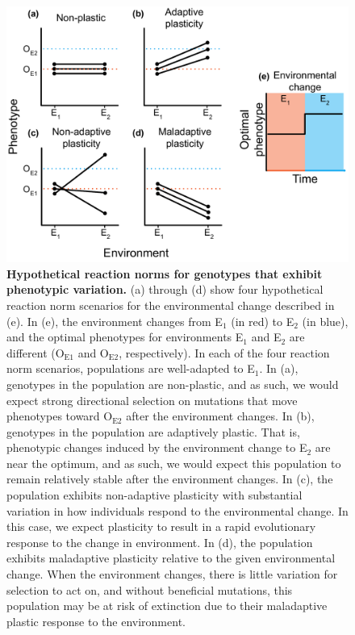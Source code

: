 \begin{figure}[ht!]
    \centering
    \includegraphics[width=\textwidth]{media/reaction-norms.pdf}
    \caption{\small
    \textbf{Hypothetical reaction norms for genotypes that exhibit phenotypic variation.}
    (a) through (d) show four hypothetical reaction norm scenarios for the environmental change described in (e).  
    In (e), the environment changes from E$_1$ (in red) to E$_2$ (in blue), and the optimal phenotypes for environments E$_1$ and E$_2$ are different (O$_{\text{E}1}$ and O$_{\text{E}2}$, respectively).
    In each of the four reaction norm scenarios, populations are well-adapted to E$_1$.
    In (a), genotypes in the population are non-plastic, and as such, we would expect strong directional selection on mutations that move phenotypes toward O$_{\text{E}2}$ after the environment changes.
    In (b), genotypes in the population are adaptively plastic. 
    That is, phenotypic changes induced by the environment change to E$_2$ are near the optimum, and as such, we would expect this population to remain relatively stable after the environment changes.
    In (c), the population exhibits non-adaptive plasticity with substantial variation in how individuals respond to the environmental change. 
    In this case, we expect plasticity to result in a rapid evolutionary response to the change in environment.  
    In (d), the population exhibits maladaptive plasticity relative to the given environmental change. 
    When the environment changes, there is little variation for selection to act on, and without beneficial mutations, this population may be at risk of extinction due to their maladaptive plastic response to the environment.
    }
    \label{fig:reaction-norms}
\end{figure}

